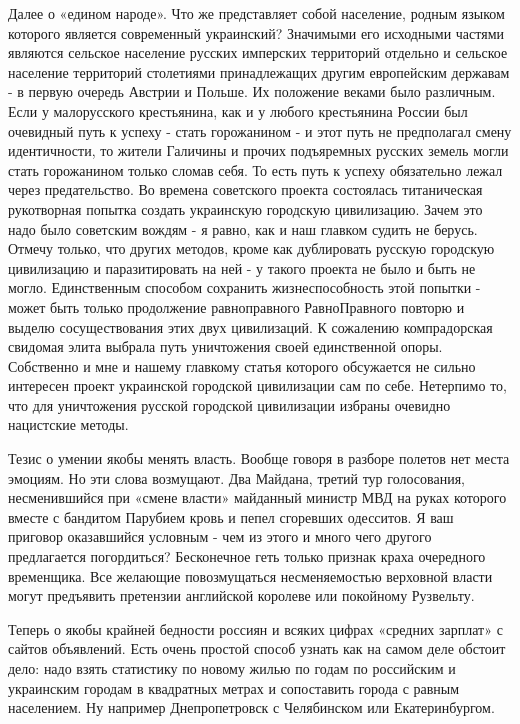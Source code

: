 \begin{itemize}
\begin{itemize}
Далее о «едином народе». Что же представляет собой население, родным языком
которого является современный украинский? Значимыми его исходными частями
являются сельское население русских имперских территорий отдельно и сельское
население территорий столетиями принадлежащих другим европейским державам - в
первую очередь Австрии и Польше. Их положение веками было различным. Если у
малорусского крестьянина, как и у любого крестьянина России был очевидный путь
к успеху - стать горожанином - и этот путь не предполагал смену идентичности,
то жители Галичины и прочих подъяремных русских земель могли стать горожанином
только сломав себя. То есть путь к успеху обязательно лежал через
предательство. Во времена советского проекта состоялась титаническая
рукотворная попытка создать украинскую городскую цивилизацию. Зачем это надо
было советским вождям - я равно, как и наш главком судить не берусь. Отмечу
только, что других методов, кроме как дублировать русскую городскую цивилизацию
и паразитировать на ней - у такого проекта не было и быть не могло.
Единственным способом сохранить жизнеспособность этой попытки - может быть
только продолжение равноправного РавноПравного повторю и выделю сосуществования
этих двух цивилизаций. К сожалению компрадорская свидомая элита выбрала путь
уничтожения своей единственной опоры. Собственно и мне и нашему главкому статья
которого обсужается не сильно интересен проект украинской городской цивилизации
сам по себе. Нетерпимо то, что для уничтожения русской городской цивилизации
избраны очевидно нацистские методы.

Тезис о умении якобы менять власть. Вообще говоря в разборе полетов нет места
эмоциям. Но эти слова возмущают. Два Майдана, третий тур голосования,
несменившийся при «смене власти» майданный министр МВД на руках которого вместе
с бандитом Парубием кровь и пепел сгоревших одесситов. Я ваш приговор
оказавшийся условным - чем из этого и много чего другого предлагается
погордиться? Бесконечное геть только признак краха очередного временщика. Все
желающие повозмущаться несменяемостью верховной власти могут предъявить
претензии английской королеве или покойному Рузвельту. \Smiley[1.0][yellow]

Теперь о якобы крайней бедности россиян и всяких цифрах «средних зарплат» с
сайтов объявлений. \Smiley[1.0][yellow] Есть очень простой способ узнать как на самом деле
обстоит дело: надо взять статистику по новому жилью по годам по российским и
украинским городам в квадратных метрах и сопоставить города с равным
населением. Ну например Днепропетровск с Челябинском или Екатеринбургом.


\end{itemize}
\end{itemize}

